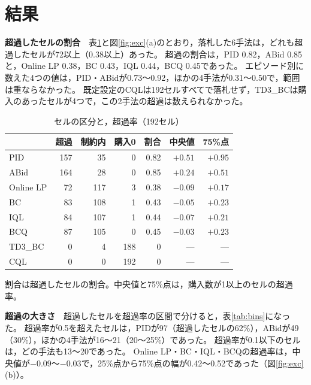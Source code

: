 \documentclass[twocolumn, 10pt]{ujarticle}
\begin{document}
\section{結果}\label{sec:e-result}

\textbf{超過したセルの割合}　表\ref{tab:share}と図\ref{fig:exc}(a)のとおり，落札した6手法は，どれも超過したセルが72以上（0.38以上）あった。
超過の割合は，PID 0.82，ABid 0.85と，Online LP 0.38，BC 0.43，IQL 0.44，BCQ 0.45であった。
エピソード別に数えた4つの値は，PID・ABidが0.73〜0.92，ほかの4手法が0.31〜0.50で，範囲は重ならなかった。
既定設定のCQLは192セルすべてで落札せず，TD3\_BCは購入のあったセルが4つで，この2手法の超過は数えられなかった。

\begin{table}[H]
\centering
\caption{セルの区分と，超過率（192セル）}
\label{tab:share}
\footnotesize\setlength{\tabcolsep}{3pt}
\begin{tabularx}{\linewidth}{@{}Xrrrrrr@{}}
\toprule
 & 超過 & 制約内 & 購入0 & 割合 & 中央値 & 75\%点 \\
\midrule
PID & 157 & 35 & 0 & 0.82 & $+0.51$ & $+0.95$ \\
ABid & 164 & 28 & 0 & 0.85 & $+0.24$ & $+0.51$ \\
Online LP & 72 & 117 & 3 & 0.38 & $-0.09$ & $+0.17$ \\
BC & 83 & 108 & 1 & 0.43 & $-0.05$ & $+0.23$ \\
IQL & 84 & 107 & 1 & 0.44 & $-0.07$ & $+0.21$ \\
BCQ & 87 & 105 & 0 & 0.45 & $-0.03$ & $+0.23$ \\
TD3\_BC & 0 & 4 & 188 & 0 & --- & --- \\
CQL & 0 & 0 & 192 & 0 & --- & --- \\
\bottomrule
\end{tabularx}
\par\smallskip
\raggedright 割合は超過したセルの割合。中央値と75\%点は，購入数が1以上のセルの超過率。
\end{table}

\textbf{超過の大きさ}　超過したセルを超過率の区間で分けると，表\ref{tab:bins}になった。
超過率が0.5を超えたセルは，PIDが97（超過したセルの62\%），ABidが49（30\%），ほかの4手法が16〜21（20〜25\%）であった。
超過率が0.1以下のセルは，どの手法も13〜20であった。
Online LP・BC・IQL・BCQの超過率は，中央値が$-0.09$〜$-0.03$で，25\%点から75\%点の幅が0.42〜0.52であった（図\ref{fig:exc}(b)）。
\end{document}
